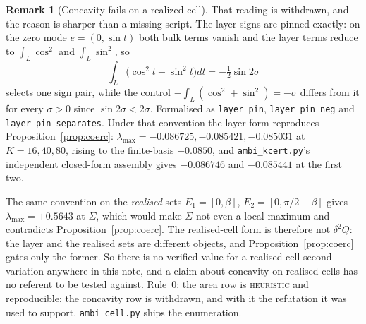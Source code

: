 \documentclass[11pt]{article}
\theoremstyle{definition}
\newtheorem{remark}[theorem]{Remark}
\newcommand{\Sig}{\Sigma}
\begin{document}
\begin{remark}[Concavity fails on a realized cell]
That reading is withdrawn, and the reason is sharper than a missing script. The layer
signs are pinned exactly: on the zero mode $e=(0,\sin t)$ both bulk terms vanish and the
layer terms reduce to $\int_L\cos^2$ and $\int_L\sin^2$, so
\[
  \int_L\bigl(\cos^2 t-\sin^2 t\bigr)dt=-\tfrac12\sin2\sigma
\]
selects one sign pair, while the control $-\int_L(\cos^2+\sin^2)=-\sigma$ differs from it
for every $\sigma>0$ since $\sin2\sigma<2\sigma$. Formalised as \texttt{layer\_pin},
\texttt{layer\_pin\_neg} and \texttt{layer\_pin\_separates}. Under that convention the
layer form reproduces Proposition~\ref{prop:coerc}: $\lambda_{\max}=-0.086725,-0.085421,
-0.085031$ at $K=16,40,80$, rising to the finite-basis $-0.0850$, and
\texttt{ambi\_kcert.py}'s independent closed-form assembly gives $-0.086746$ and $-0.085441$
at the first two.

The same convention on the \emph{realised} sets $E_1=[0,\beta]$, $E_2=[0,\pi/2-\beta]$ gives
$\lambda_{\max}=+0.5643$ at $\Sig$, which would make $\Sig$ not even a local maximum and
contradicts Proposition~\ref{prop:coerc}. The realised-cell form is therefore not
$\delta^2Q$: the layer and the realised sets are different objects, and
Proposition~\ref{prop:coerc} gates only the former. So there is no verified value for a
realised-cell second variation anywhere in this note, and a claim about concavity on
realised cells has no referent to be tested against. Rule~0: the area row is
\textsc{heuristic} and reproducible; the concavity row is withdrawn, and with it the
refutation it was used to support. \texttt{ambi\_cell.py} ships the enumeration.


\end{remark}
\end{document}
